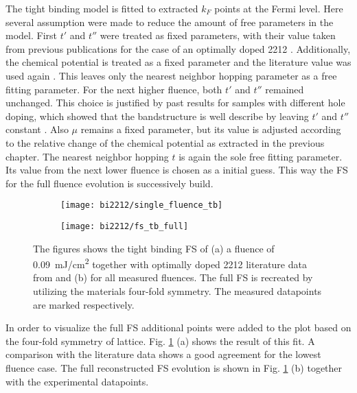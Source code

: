 The tight binding model is fitted to extracted $k_F$ points at the Fermi level.
Here several assumption were made to reduce the amount of free parameters in the model.
First $t'$ and $t''$ were treated as fixed parameters, with their value taken from previous publications for the case of an optimally doped 2212 \cite{kondo_hole-concentration_2004}.
Additionally, the chemical potential is treated as a fixed parameter and the literature value was used again \cite{kondo_hole-concentration_2004}.
This leaves only the nearest neighbor hopping parameter as a free fitting parameter.
For the next higher fluence, both $t'$ and $t''$ remained unchanged.
This choice is justified by past results for samples with different hole doping, which showed that the bandstructure is well describe by leaving $t'$ and $t''$ constant \cite{drozdov_phase_2018}.
Also $\mu$ remains a fixed parameter, but its value is adjusted  according to the relative change of the chemical potential as extracted in the previous chapter.
The nearest neighbor hopping $t$ is again the sole free fitting parameter.
Its value from the next lower fluence is chosen as a initial guess.
This way the FS for the full fluence evolution is successively build.

\begin{figure}[b!]
	\centering
	\begin{subfigure}[t!]{0.33\textwidth}
		\texttt{[image: bi2212/single\_fluence\_tb]}
		\caption{}
	\end{subfigure}
	\begin{subfigure}[t!]{0.33\textwidth}
		\texttt{[image: bi2212/fs\_tb\_full]}
		\caption{}
	\end{subfigure}
	\caption{The figures shows the tight binding FS of (a) a fluence of \qty{0.09}{\milli\joule/\centi\meter\squared} together with optimally doped 2212 literature data from \cite{kondo_hole-concentration_2004} and (b) for all measured fluences. The full FS is recreated by utilizing the materials four-fold symmetry. The measured datapoints are marked respectively.}
	\label{fig:fs_tb}
\end{figure}

In order to visualize the full FS additional points were added to the plot based on the four-fold symmetry of lattice.
Fig. \ref{fig:fs_tb} (a) shows the result of this fit.
A comparison with the literature data shows a good agreement for the lowest fluence case.
The full reconstructed FS evolution is shown in Fig. \ref{fig:fs_tb} (b) together with the experimental datapoints.


